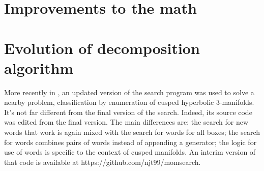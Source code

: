 \section{Improvements to the math}
\section{Evolution of decomposition algorithm}

More recently in \cite{GHMTY}, an updated version of the search program was used
to solve a nearby problem, classification by enumeration of cusped hyperbolic
3-manifolds.
It's not far different from the final version of the search.
Indeed, its source code was edited from the final version.
The main differences are:
the search for new words that work is again mixed
with the search for words for all boxes;
the search for words combines pairs of words instead of appending a generator;
the logic for use of words is specific to the context of cusped manifolds.
An interim version of that code is available at https://github.com/njt99/momsearch.
